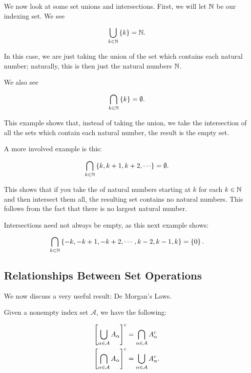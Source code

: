 \begin{example}
We now look at some set unions and intersections.
First, we will let $\mathbb{N}$ be our indexing set.
We see

\begin{equation}
    \bigcup_{k\in\mathbb{N}} \left\{ k \right\} = \mathbb{N}.
\end{equation}

\noindent
In this case, we are just taking the union of the set which contains
each natural number;
naturally, this is then just the natural numbers $\mathbb{N}$.

We also see

\begin{equation}
    \bigcap_{k\in\mathbb{N}} \left\{ k \right\} = \emptyset.
\end{equation}

\noindent
This example shows that, instead of taking the union,
we take the intersection of all the sets which contain each natural number,
the result is the empty set.

A more involved example is this:

\begin{equation}
    \bigcap_{k\in\N} \braces{k,k+1,k+2,\cdots} = \emptyset.
\end{equation}

\noindent
This shows that if you take the of natural numbers starting at
$k$ for each $k\in\mathbb{N}$ and then intersect them all,
the resulting set contains no natural numbers.
This follows from the fact that there is no largest natural number.

Intersections need not always be empty, as this next example shows:

\begin{equation}
    \bigcap_{k\in\mathbb{N}} \left\{ -k,-k+1,-k+2,\cdots,k-2,k-1,k \right\} = \left\{ 0 \right\}.
\end{equation}
\end{example}


\subsection{Relationships Between Set Operations}

We now discuss a very useful result: De Morgan's Laws.

\begin{thm}
Given a nonempty index set $\mathcal{A}$, we have the following:

\begin{align}
    \left[ \bigcup_{\alpha\in\mathcal{A}} A_{\alpha} \right]^{c}
        &= \bigcap_{\alpha\in\mathcal{A}} A_{\alpha}^{c} \nonumber\\
    \left[ \bigcap_{\alpha\in\mathcal{A}} A_{\alpha} \right]^{c}
        &= \bigcup_{\alpha\in\mathcal{A}} A_{\alpha}^{c}.
\end{align}
\end{thm}

